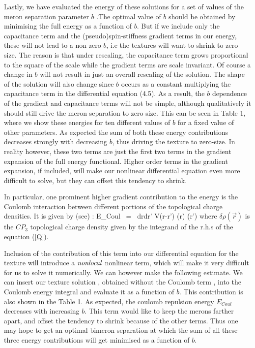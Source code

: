 Lastly, we have  evaluated the energy of these solutions for a
set of values of the meron separation parameter $b$ .The optimal value
of $b$ should be obtained by minimising the full energy as a function of $b$.
But if we include only the capacitance term and the (pseudo)spin-stiffness
 gradient terms in our energy, these will not lead to a non zero $b$, 
 i.e the textures 
will want to shrink to zero size. The reason is that under rescaling,
the capacitance term grows proportional to the square of the scale while
the gradient terms are scale invariant. Of course a change in $b$ will not
 result
 in just an overall rescaling of the solution. The shape of the solution
 will also change since $b$ occurs as a  constant multiplying the 
 capacitance term in the differential equation (4.5).  As a result,
 the $b$ dependence of the gradient and capacitance terms will not be simple,
 although qualitatively it should still drive the meron separation to zero 
 size. This can be seen in Table 1, where we show these energies for ten  
different values of $b$ for a fixed value of other parameters. 
 As expected the sum of both these energy contributions decreases 
 strongly with decreasing $b$, thus driving the texture to zero-size.
  In reality however, these two terms are just the first two
   terms in the gradient expansion of the full energy
   functional. Higher order terms in the 
   gradient expansion, if included, will make our nonlinear differential
    equation even more difficult to solve, but they can 
    offset this tendency to shrink.

   In particular, one prominent higher gradient contribution to the energy is
 the Coulomb interaction between different portions of the topological
  charge densities. It is given by (see\cite{Arov}) :
\beq E_{Coul}  \ = \ \int d{\vec r}d{\vec r'}
V({\vec r}-{\vec r'})
\delta \rho({\vec r}) \delta \rho({\vec r'}) \label{3COL} \eeq
where $\delta \rho({\vec r})$ is the $CP_3$ topological charge 
density given by the integrand of the r.h.s of the equation (\ref{Q}).

Inclusion of the contribution of this term into our 
differential equation for the
texture will introduce a  $\it{nonlocal}$ nonlinear term, which will make 
it very difficult for us to solve it numerically. We can however make the 
following estimate. We can insert our texture solution , obtained without
 the Coulomb term , into the Coulomb energy integral and evaluate it as a
 function of $b$. This contribution is also shown in the Table 1. 
As expected, the coulomb repulsion 
energy $E_{Coul}$ decreases with increasing $b$. This 
term would like to keep the merons farther apart, and 
  offset the  tendency
 to shrink because of the other terms. 
 Thus one may hope to  get an optimal bimeron separation at which
the sum of all these three energy contributions will get minimised as a 
function of $b$.

